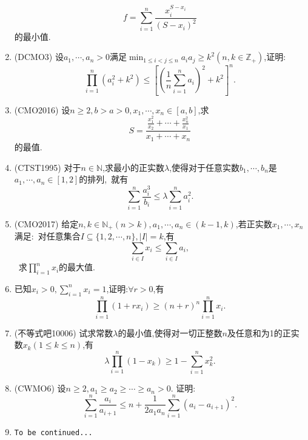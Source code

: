 \documentclass{article}
\begin{document}
\begin{enumerate}
            $$f=\sum_{i=1}^n{\frac{x_i^{S-x_i}}{(S-x_i)^2}}$$的最小值.
        \item (DCMO3) 设$a_1,\cdots,a_n>0$满足$\min_{1\le i<j \le n}a_ia_j\geq k^2 (n,k\in\mathbb{Z}_{+})$,证明:\ 
            $$\prod_{i=1}^n{\left( a_i^2 + k^2 \right)}\leq{\left[ {\left( \frac{1}{n}\sum_{i=1}^n{a_i} \right)}^2 + k^2 \right]}^n.$$
        \item (CMO2016) 设$n\geq2,b>a>0,x_1,\cdots,x_n\in[a,b]$,求\ 
            $$S=\frac{\frac{x_1^2}{x_2}+\cdots+\frac{x_n^2}{x_1}}{x_1+\cdots+x_n}$$的最值.
        \item (CTST1995) 对于$n\in\mathbb{N}$,求最小的正实数$\lambda$,使得对于任意实数$b_1,\cdots,b_n$是$a_1,\cdots,a_n\in[1,2]$的排列,\
            就有$$\sum_{i=1}^n{\frac{a_i^3}{b_i}}\leq\lambda\sum_{i=1}^n{a_i^2}.$$
        \item (CMO2017) 给定$n,k\in\mathbb{N}_{+}(n>k),a_1,\cdots,a_n\in(k-1,k)$,若正实数$x_1,\cdots,x_n$满足:\ 
            对任意集合$I\subseteq\{ 1,2,\cdots,n \},\mid I \mid=k$,有$$\sum_{i\in I}{x_i}\leq\sum_{i\in I}{a_i},$$\ 
            求$\prod_{i=1}^n{x_i}$的最大值.
        \item 已知$x_i>0,\sum_{i=1}^n{x_i}=1$,证明:$\forall r>0$,有
            $$\prod_{i=1}^n(1+rx_i)\geq(n+r)^n\prod_{i=1}^n{x_i}.$$
        \item (不等式吧10006) 试求常数$\lambda$的最小值,使得对一切正整数$n$及任意和为1的正实数$x_k(1\le k \le n)$,有\ 
            $$\lambda\prod_{i=1}^n{(1-x_k)}\geq 1-\sum_{i=1}^n{x_k^2}.$$
        \item (CWMO6) 设$n\ge2,a_1\ge a_2\ge\cdots\ge a_n>0$. 证明:\
            $$\sum_{i=1}^n{\frac{a_i}{a_{i+1}}}\leq n+\frac{1}{2a_1a_n}\sum_{i=1}^n{\left( a_i - a_{i+1} \right)}^2.$$
        \item \texttt{To be continued...}
    \end{enumerate}
\end{document}
